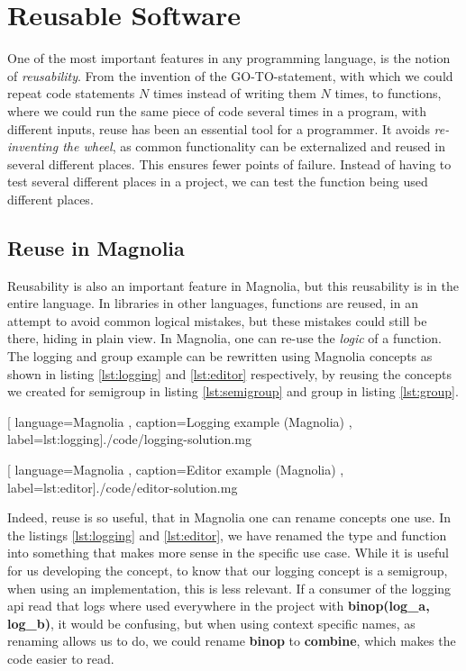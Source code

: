 \section{Reusable Software}

One of the most important features in any programming language, is the notion
of \textit{reusability}. From the invention of the GO-TO-statement, with which
we could repeat code statements $N$ times instead of writing them $N$ times, to
functions, where we could run the same piece of code several times in a
program, with different inputs, reuse has been an essential tool for a
programmer. It avoids \textit{re-inventing the wheel}, as common functionality
can be externalized and reused in several different places. This ensures
fewer points of failure. Instead of having to test several different places in
a project, we can test the function being used different places.

\subsection{Reuse in Magnolia}

Reusability is also an important feature in Magnolia, but this reusability is in
the entire language. In libraries in other languages, functions are reused, in
an attempt to avoid common logical mistakes, but these mistakes could still be
there, hiding in plain view. In Magnolia, one can re-use the \textit{logic} of a
function. The logging and group example can be rewritten using Magnolia concepts
as shown in listing \ref{lst:logging} and \ref{lst:editor} respectively, by
reusing the concepts we created for semigroup in listing \ref{lst:semigroup} and group
in listing \ref{lst:group}.

\begin{center}
  
    [ language=Magnolia
    , caption={Logging example (Magnolia)}
    , label=lst:logging]{./code/logging-solution.mg}
\end{center}

\begin{center}
  
    [ language=Magnolia
    , caption={Editor example (Magnolia)}
    , label=lst:editor]{./code/editor-solution.mg}
\end{center}

Indeed, reuse is so useful, that in Magnolia one can rename concepts one use.
In the listings \ref{lst:logging} and \ref{lst:editor}, we have renamed the type
and function into something that makes more sense in the specific use case.
While it is useful for us developing the concept, to know that our logging
concept is a semigroup, when using an implementation, this is less relevant.
If a consumer of the logging \gls{api} read that logs where used everywhere in
the project with \textbf{binop(log\_a, log\_b)}, it would be confusing, but when
using context specific names, as renaming allows us to do, we could rename
\textbf{binop} to \textbf{combine}, which makes the code easier to read.

